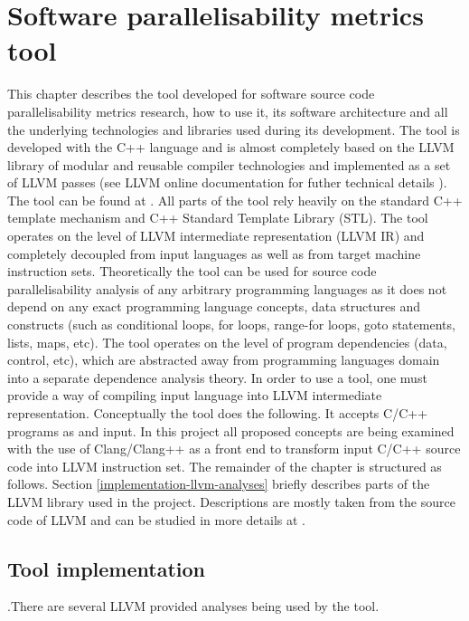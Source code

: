 \chapter{Software parallelisability metrics tool}
\qquad This chapter describes the tool developed for software source code parallelisability metrics research, how to use it, its software architecture and all the underlying technologies and libraries used during its development. \newline\null\qquad The tool is developed with the C++ language and is almost completely based on the \textsc{LLVM} library of modular and reusable compiler technologies \cite{llvm} \cite{llvm-official-website} and implemented as a set of LLVM passes (see LLVM online documentation for futher technical details \cite{llvm-online-docs}). The tool can be found at \cite{ppar-tool}. All parts of the tool rely heavily on the standard C++ template mechanism and C++ Standard Template Library (STL). \newline \null\qquad The tool operates on the level of LLVM intermediate representation \cite{llvm-online-docs-ir} (LLVM IR) and completely decoupled from input languages as well as from target machine instruction sets. Theoretically the tool can be used for source code parallelisability analysis of any arbitrary programming languages as it does not depend on any exact programming language concepts, data structures and constructs (such as conditional loops, for loops, range-for loops, goto statements, lists, maps, etc). The tool operates on the level of program dependencies (data, control, etc), which are abstracted away from programming languages domain into a separate dependence analysis theory. In order to use a tool, one must provide a way of compiling input language into LLVM intermediate representation. \newline \null\qquad Conceptually the tool does the following. It accepts C/C++ programs as and input. \newline \null\qquad In this project all proposed concepts are being examined with the use of Clang/Clang++ as a front end to transform input C/C++ source code into LLVM instruction set. \newline\null\qquad The remainder of the chapter is structured as follows. Section \ref{implementation-llvm-analyses} briefly describes parts of the LLVM library used in the project. Descriptions are mostly taken from the source code of LLVM and can be studied in more details at \cite{llvm-doxygen-docs}.     

\section{Tool implementation} \label{tool-implementation}
\qquad .There are several LLVM provided analyses being used by the tool.

